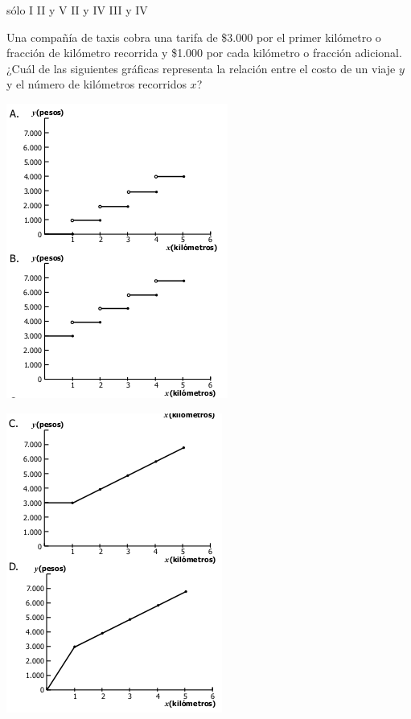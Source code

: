 \documentclass[10pt,letterpaper,addpoints]{exam}
\begin{document}
\begin{questions}
  \begin{oneparchoices}
\choice sólo I
\choice II y V
\choice II y IV
\CorrectChoice III y IV  
  \end{oneparchoices}
  \question Una compañía de taxis cobra una tarifa de \$3.000 por el primer kilómetro o fracción de kilómetro recorrida y \$1.000 por cada kilómetro o fracción adicional. ¿Cuál de las siguientes gráficas representa la relación entre el costo de un viaje $y$ y el número de kilómetros recorridos $x$?
  
  \begin{minipage}{0.45\textwidth}
  \includegraphics[scale=.7]{Images/grafica-taxi.png}
\end{minipage}\hfill
\begin{minipage}{.45\textwidth}
  \includegraphics[scale=.7]{Images/grafica-taxi-2.png}
\end{minipage}


\end{questions}
\end{document}
